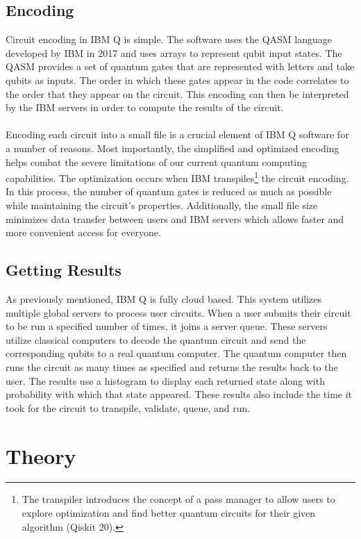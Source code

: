 \documentclass[12pt]{article}
\begin{document}
    \subsection{Encoding}
        Circuit encoding in IBM Q is simple. The software uses the QASM language developed by IBM in 2017 and uses arrays to represent qubit input states. The QASM provides a set of quantum gates that are represented with letters and take qubits as inputs. The order in which these gates appear in the code correlates to the order that they appear on the circuit. This encoding can then be interpreted by the IBM servers in order to compute the results of the circuit.
        \\
         \smallskip
        \\
        Encoding each circuit into a small file is a crucial element of IBM Q software for a number of reasons. Most importantly, the simplified and optimized encoding helps combat the severe limitations of our current quantum computing capabilities. The optimization occurs when IBM transpiles\footnote{The transpiler introduces the concept of a pass manager to allow users to explore optimization and find better quantum circuits for their given algorithm (Qiskit 20).} the circuit encoding. In this process, the number of quantum gates is reduced as much as possible while maintaining the circuit's properties. Additionally, the small file size minimizes data transfer between users and IBM servers which allows faster and more convenient access for everyone.

    \subsection{Getting Results}
        As previously mentioned, IBM Q is fully cloud based. This system utilizes multiple global servers to process user circuits. When a user submits their circuit to be run a specified number of times, it joins a server queue. These servers utilize classical computers to decode the quantum circuit and send the corresponding qubits to a real quantum computer. The quantum computer then runs the circuit as many times as specified and returns the results back to the user. The results use a histogram to display each returned state along with probability with which that state appeared. These results also include the time it took for the circuit to transpile, validate, queue, and run.
        
        
\section{Theory}
\end{document}
